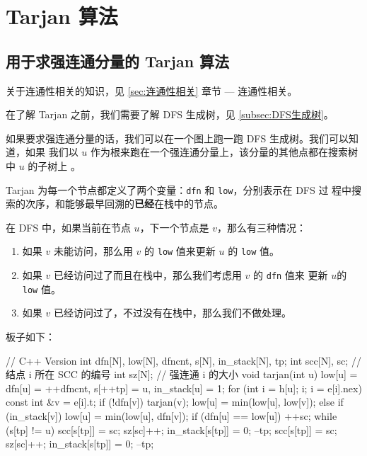 \section{Tarjan 算法}\label{sec:Tarjan}
\subsection{用于求强连通分量的 Tarjan 算法}
关于连通性相关的知识，见 \ref{sec:连通性相关} 章节 --- 连通性相关。

在了解 Tarjan 之前，我们需要了解 DFS 生成树，见 \ref{subsec:DFS生成树}。

如果要求强连通分量的话，我们可以在一个图上跑一跑 DFS 生成树。我们可以知道，如果
我们以 $u$ 作为根来跑在一个强连通分量上，该分量的其他点都在搜索树中 $u$ 的子树上
。

Tarjan 为每一个节点都定义了两个变量：\verb|dfn| 和 \verb|low|，分别表示在 DFS 过
程中搜索的次序，和能够最早回溯的{\bfseries 已经}在栈中的节点。

在 DFS 中，如果当前在节点 $u$，下一个节点是 $v$，那么有三种情况：
\begin{enumerate}
    \item 如果 $v$ 未能访问，那么用 $v$ 的 \verb|low| 值来更新 $u$ 的 \verb|low|
        值。

    \item 如果 $v$ 已经访问过了而且在栈中，那么我们考虑用 $v$ 的 \verb|dfn| 值来
        更新 $u$的 \verb|low| 值。

    \item 如果 $v$ 已经访问过了，不过没有在栈中，那么我们不做处理。
\end{enumerate}

板子如下：
\begin{Cpp}
// C++ Version
int dfn[N], low[N], dfncnt, s[N], in_stack[N], tp;
int scc[N], sc;  // 结点 i 所在 SCC 的编号
int sz[N];       // 强连通 i 的大小
void tarjan(int u) {
  low[u] = dfn[u] = ++dfncnt, s[++tp] = u, in_stack[u] = 1;
  for (int i = h[u]; i; i = e[i].nex) {
    const int &v = e[i].t;
    if (!dfn[v]) {
      tarjan(v);
      low[u] = min(low[u], low[v]);
    } else if (in_stack[v]) {
      low[u] = min(low[u], dfn[v]);
    }
  }
  if (dfn[u] == low[u]) {
    ++sc;
    while (s[tp] != u) {
      scc[s[tp]] = sc;
      sz[sc]++;
      in_stack[s[tp]] = 0;
      --tp;
    }
    scc[s[tp]] = sc;
    sz[sc]++;
    in_stack[s[tp]] = 0;
    --tp;
  }
}
\end{Cpp}
